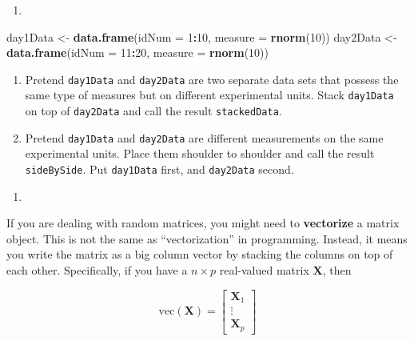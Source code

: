 \documentclass[12pt,krantz2]{krantz}
\makeatletter
\newenvironment{Shaded}{\begin{snugshade}}{\end{snugshade}}
\newcommand{\DataTypeTok}[1]{\textcolor[rgb]{0.27,0.27,0.27}{#1}}
\newcommand{\DecValTok}[1]{\textcolor[rgb]{0.06,0.06,0.06}{#1}}
\newcommand{\KeywordTok}[1]{\textcolor[rgb]{0.27,0.27,0.27}{\textbf{#1}}}
\newcommand{\NormalTok}[1]{#1}
\newcommand{\OperatorTok}[1]{\textcolor[rgb]{0.43,0.43,0.43}{\textbf{#1}}}
\newcommand{\StringTok}[1]{\textcolor[rgb]{0.5,0.5,0.5}{#1}}
\providecommand{\tightlist}{%
  \setlength{\itemsep}{0pt}\setlength{\parskip}{0pt}}
\newenvironment{kframe}{%
\medskip{}
\setlength{\fboxsep}{.8em}
 \def\at@end@of@kframe{}%
 \ifinner\ifhmode%
  \def\at@end@of@kframe{\end{minipage}}%
  \begin{minipage}{\columnwidth}%
 \fi\fi%
 \def\FrameCommand##1{\hskip\@totalleftmargin \hskip-\fboxsep
 \colorbox{shadecolor}{##1}\hskip-\fboxsep
     \hskip-\linewidth \hskip-\@totalleftmargin \hskip\columnwidth}%
 \MakeFramed {\advance\hsize-\width
   \@totalleftmargin\z@ \linewidth\hsize
   \@setminipage}}%
 {\par\unskip\endMakeFramed%
 \at@end@of@kframe}
\renewenvironment{Shaded}{\begin{kframe}}{\end{kframe}}
\makeatother
\begin{document}
\begin{enumerate}
\def\labelenumi{\arabic{enumi}.}
\setcounter{enumi}{1}
\item
\end{enumerate}

\begin{Shaded}
\begin{Highlighting}[]
\NormalTok{day1Data <-}\StringTok{ }\KeywordTok{data.frame}\NormalTok{(}\DataTypeTok{idNum =} \DecValTok{1}\OperatorTok{:}\DecValTok{10}\NormalTok{, }
                       \DataTypeTok{measure =} \KeywordTok{rnorm}\NormalTok{(}\DecValTok{10}\NormalTok{))}
\NormalTok{day2Data <-}\StringTok{ }\KeywordTok{data.frame}\NormalTok{(}\DataTypeTok{idNum =} \DecValTok{11}\OperatorTok{:}\DecValTok{20}\NormalTok{, }
                       \DataTypeTok{measure =} \KeywordTok{rnorm}\NormalTok{(}\DecValTok{10}\NormalTok{))}
\end{Highlighting}
\end{Shaded}

\begin{enumerate}
\def\labelenumi{\alph{enumi})}
\tightlist
\item
  Pretend \texttt{day1Data} and \texttt{day2Data} are two separate data sets that possess the same type of measures but on different experimental units. Stack \texttt{day1Data} on top of \texttt{day2Data} and call the result \texttt{stackedData}.
\item
  Pretend \texttt{day1Data} and \texttt{day2Data} are different measurements on the same experimental units. Place them shoulder to shoulder and call the result \texttt{sideBySide}. Put \texttt{day1Data} first, and \texttt{day2Data} second.
\end{enumerate}

\begin{enumerate}
\def\labelenumi{\arabic{enumi}.}
\setcounter{enumi}{2}
\item
\end{enumerate}

If you are dealing with random matrices, you might need to \textbf{vectorize} a matrix object. This is not the same as ``vectorization'' in programming. Instead, it means you write the matrix as a big column vector by stacking the columns on top of each other. Specifically, if you have a \(n \times p\) real-valued matrix \(\mathbf{X}\), then

\begin{equation} 
\text{vec}(\mathbf{X}) =\begin{bmatrix} \mathbf{X}_1 \\ \vdots \\ \mathbf{X}_p \end{bmatrix} 
\end{equation}
\end{document}
